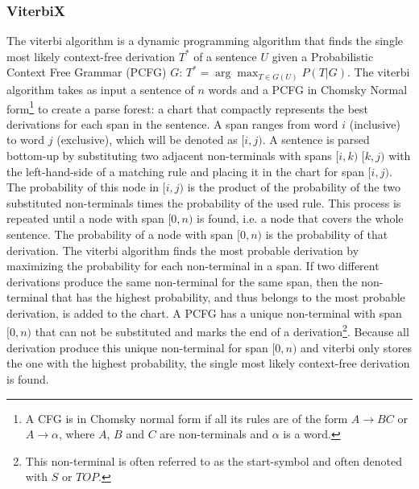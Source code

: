 \documentclass[a4paper]{article}
\begin{document}
\subsubsection{ViterbiX} %
The viterbi algorithm is a dynamic programming algorithm that finds the single most likely context-free derivation $T^*$ of a sentence $U$ given a Probabilistic Context Free Grammar (PCFG) $G$: $T^* = \arg \max_{T \in G(U)} P(T|G)$. The viterbi algorithm takes as input a sentence of $n$ words and a PCFG in Chomsky Normal form\footnote{A CFG is in Chomsky normal form if all its rules are of the form $A \rightarrow BC$ or $A \rightarrow \alpha$, where $A$, $B$ and $C$ are non-terminals and $\alpha$ is a word.} to create a parse forest: a chart that compactly represents the best derivations for each span in the sentence. A span ranges from word $i$ (inclusive) to word $j$ (exclusive), which will be denoted as $[i,j)$. A sentence is parsed bottom-up by substituting two adjacent non-terminals with spans $[i,k)$ $[k,j)$ with the left-hand-side of a matching rule and placing it in the chart for span $[i,j)$. The probability of this node in $[i,j)$ is the product of the probability of the two substituted non-terminals times the probability of the used rule. This process is repeated until a node with span $[0,n)$ is found, i.e. a node that covers the whole sentence. The probability of a node with span $[0,n)$ is the probability of that derivation. The viterbi algorithm finds the most probable derivation by maximizing the probability for each non-terminal in a span. If two different derivations produce the same non-terminal for the same span, then the non-terminal that has the highest probability, and thus belongs to the most probable derivation, is added to the chart. A PCFG has a unique non-terminal with span $[0,n)$ that can not be substituted and marks the end of a derivation\footnote{This non-terminal is often referred to as the start-symbol and often denoted with $S$ or $TOP$.}. Because all derivation produce this unique non-terminal for span $[0,n)$ and viterbi only stores the one with the highest probability, the single most likely context-free derivation is found. 
\end{document}

